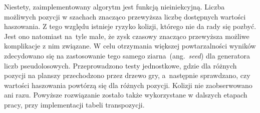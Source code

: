 Niestety, zaimplementowany algorytm jest funkcją nieiniekcyjną.
Liczba możliwych pozycji w szachach znacząco przewyższa liczbę dostępnych wartości haszowania.
Z tego względu istnieje ryzyko kolizji, którego nie da rady się pozbyć.
Jest ono natomiast na~tyle małe, że zysk czasowy znacząco przewyższa możliwe komplikacje z nim związane.
W celu otrzymania większej powtarzalności wyników zdecydowano się na zastosowanie tego samego ziarna~(ang.~\emph{seed}) dla generatora liczb pseudolosowych.
Przeprowadzono testy jednostkowe, gdzie dla różnych pozycji na planszy przechodzono przez drzewo gry, a~następnie sprawdzano, czy wartości haszowania powtórzą się dla różnych pozycji.
Kolizji nie zaobserwowano ani razu.
Powyższe rozwiązanie zostało także wykorzystane w dalszych etapach pracy, przy implementacji tabeli transpozycji.




